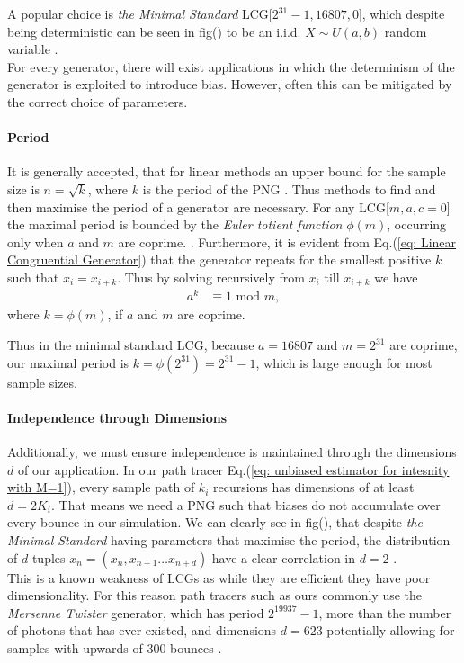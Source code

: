 \documentclass{article}
\begin{document}
A popular choice is \textit{the Minimal Standard} LCG[$2^{31}-1,16807,0$], which 
despite being deterministic can be seen in fig() to be an i.i.d.
$X \sim U(a,b)$ random variable \cite{HELLEKALEK1998485}.
\\
For every generator, there will exist applications in which the determinism of the generator
is exploited to introduce bias. However, often this can be mitigated by the correct choice of parameters.

\paragraph{Period}
It is generally accepted, that for linear methods an upper bound for the sample size is $n = \sqrt{k}$, 
where $k$ is the period of the PNG \cite{HELLEKALEK1998485}.
Thus methods to find and then maximise the period of a generator are necessary. 
For any LCG[$m,a,c=0$] the maximal period is bounded by the \textit{Euler totient function} $\phi(m)$,
occurring only when $a$ and $m$ are coprime. \cite{gentle2003random}.
Furthermore, it is evident from Eq.(\ref{eq: Linear Congruential Generator}) 
that the generator repeats for the smallest positive $k$ such that $x_{i} = x_{i+k}$.
Thus by solving recursively from $x_i$ till $x_{i+k}$ we have
\begin{align}
    a^{k} &\equiv 1\text{ mod }m,
\end{align}
where $k=\phi(m)$, if $a$ and $m$ are coprime. \cite{gentle2003random}

Thus in the minimal standard LCG, because $a=16807$ and $m=2^{31}$ are coprime,
our maximal period is $k=\phi(2^{31})=2^{31}-1$, which is large enough for most sample sizes.

\paragraph{Independence through Dimensions}
Additionally, we must ensure independence is maintained through the dimensions $d$ of our application.
In our path tracer Eq.(\ref{eq: unbiased estimator for intesnity with M=1}), 
every sample path of $k_i$ recursions has dimensions of at least $d=2K_i$. 
That means we need a PNG such that biases do not accumulate over every bounce in our simulation. 
We can clearly see in fig(), that despite \textit{the Minimal Standard} having
parameters that maximise the period, the distribution of $d$-tuples $x_n=(x_{n},x_{n+1}\dots x_{n+d})$
have a clear correlation in $d = 2$ \cite{HELLEKALEK1998485}. 
\\
This is a known weakness of LCGs as while they are efficient they have poor dimensionality.
For this reason path tracers such as ours commonly use the \textit{Mersenne Twister} generator, which has 
period $2^{19937}-1$, more than the number of photons that has ever existed,
and dimensions $d = 623$ potentially allowing for samples with upwards of $300$
bounces \cite{10.1145/272991.272995}. 
\end{document}
